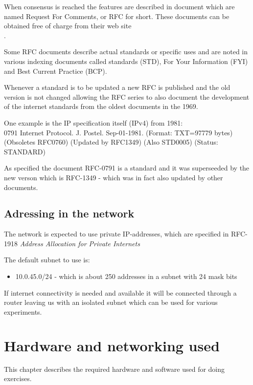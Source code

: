 \documentclass[a4paper,11pt,notitlepage]{report}
\begin{document}
When consensus is reached the features are described in document which
are named Request For Comments, or RFC for short. These documents can
be obtained free of charge from their web site\\ .

Some RFC documents describe actual standards or specific uses and are noted in various
indexing documents called standards (STD), For Your Information (FYI) and Best
Current Practice (BCP).

Whenever a standard is to be updated a new RFC is published and the old version
is not changed allowing the RFC series to also document the development of
the internet standards from the oldest documents in the 1969.

One example is the IP specification itself (IPv4) from 1981:\\
0791 Internet Protocol. J. Postel. Sep-01-1981. (Format: TXT=97779
bytes) (Obsoletes RFC0760) (Updated by RFC1349) (Also STD0005)
(Status: STANDARD)

As specified the document RFC-0791 is a standard and it was superseeded
by the new verson which is RFC-1349 - which was in fact also updated by
other documents.


\section*{\color{titlecolor}Adressing in the network}

The network is expected to use private IP-addresses, which are specified in
RFC-1918 \emph{Address Allocation for Private Internets}

The default subnet to use is:
\begin{itemize}
\item 10.0.45.0/24 - which is about 250 addresses in a subnet with 24 mask bits
\end{itemize}

If internet connectivity is needed and available it will be connected through
a router leaving us with an isolated subnet which can be used for various experiments.


\chapter*{\color{titlecolor}Hardware and networking used}

This chapter describes the required hardware and software
used for doing exercises.
\end{document}
